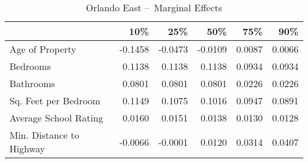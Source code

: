 \begin{table}[H]
\centering
\begin{tabular}{lrrrrr}
\toprule
 & 10\% & 25\% & 50\% & 75\% & 90\% \\
\midrule
Age of Property & -0.1458 & -0.0473 & -0.0109 & 0.0087 & 0.0066 \\
Bedrooms & 0.1138 & 0.1138 & 0.1138 & 0.0934 & 0.0934 \\
Bathrooms & 0.0801 & 0.0801 & 0.0801 & 0.0226 & 0.0226 \\
Sq. Feet per Bedroom & 0.1149 & 0.1075 & 0.1016 & 0.0947 & 0.0891 \\
Average School Rating & 0.0160 & 0.0151 & 0.0138 & 0.0130 & 0.0128 \\
Min. Distance to Highway & -0.0066 & -0.0001 & 0.0120 & 0.0314 & 0.0407 \\
\bottomrule
\end{tabular}
\caption{Orlando East – Marginal Effects}
\label{tab:orlando_east_marginal}
\end{table}
